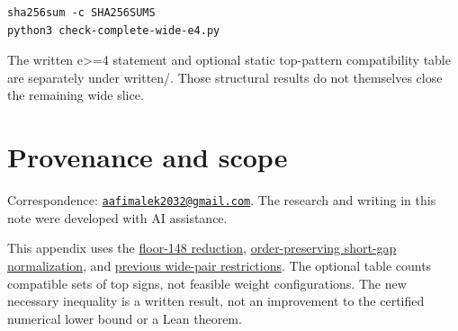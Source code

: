\documentclass[
  11pt,
]{article}
\begin{document}
\begin{verbatim}
sha256sum -c SHA256SUMS
python3 check-complete-wide-e4.py
\end{verbatim}

The written e\textgreater=4 statement and optional static top-pattern
compatibility table are separately under written/. Those structural
results do not themselves close the remaining wide slice.

\section{Provenance and scope}\label{provenance-and-scope}

Correspondence:
\href{mailto:aafimalek2032@gmail.com}{\nolinkurl{aafimalek2032@gmail.com}}.
The research and writing in this note were developed with AI assistance.

This appendix uses the
\href{https://github.com/Aafimalek/novel-discoveries/tree/c582f2587588eeeb195048a74552fe80bdc1d0e7/nine-separated-subset-sums/verification/rank-cuts-below-150/only-floor-148}{floor-148
reduction},
\href{https://github.com/Aafimalek/novel-discoveries/tree/a49d954ffe00669ed70ac7cdd68ef4091263abbc/nine-separated-subset-sums/verification/rank-cuts-below-150/short-gap-normal-form}{order-preserving
short-gap normalization}, and
\href{https://github.com/Aafimalek/novel-discoveries/tree/9dcf2aab7890589d22fc0205e87a60348c0fba4c/nine-separated-subset-sums/verification/rank-cuts-below-150/wide-pair-restrictions}{previous
wide-pair restrictions}. The optional table counts compatible sets of
top signs, not feasible weight configurations. The new necessary
inequality is a written result, not an improvement to the certified
numerical lower bound or a Lean theorem.
\end{document}

